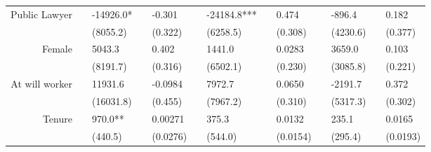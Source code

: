 \begin{tabular}{rrrrrrrrrrrrr}
Public Lawyer & \multicolumn{1}{l}{} & \multicolumn{1}{l}{-14926.0*} & \multicolumn{1}{l}{} & \multicolumn{1}{l}{-0.301} & \multicolumn{1}{l}{} & \multicolumn{1}{l}{-24184.8***} & \multicolumn{1}{l}{} & \multicolumn{1}{l}{0.474} & \multicolumn{1}{l}{} & \multicolumn{1}{l}{-896.4} & \multicolumn{1}{l}{} & \multicolumn{1}{l}{0.182} \\
      & \multicolumn{1}{l}{} & \multicolumn{1}{l}{(8055.2)} & \multicolumn{1}{l}{} & \multicolumn{1}{l}{(0.322)} & \multicolumn{1}{l}{} & \multicolumn{1}{l}{(6258.5)} & \multicolumn{1}{l}{} & \multicolumn{1}{l}{(0.308)} & \multicolumn{1}{l}{} & \multicolumn{1}{l}{(4230.6)} & \multicolumn{1}{l}{} & \multicolumn{1}{l}{(0.377)} \\
Female & \multicolumn{1}{l}{} & \multicolumn{1}{l}{5043.3} & \multicolumn{1}{l}{} & \multicolumn{1}{l}{0.402} & \multicolumn{1}{l}{} & \multicolumn{1}{l}{1441.0} & \multicolumn{1}{l}{} & \multicolumn{1}{l}{0.0283} & \multicolumn{1}{l}{} & \multicolumn{1}{l}{3659.0} & \multicolumn{1}{l}{} & \multicolumn{1}{l}{0.103} \\
      & \multicolumn{1}{l}{} & \multicolumn{1}{l}{(8191.7)} & \multicolumn{1}{l}{} & \multicolumn{1}{l}{(0.316)} & \multicolumn{1}{l}{} & \multicolumn{1}{l}{(6502.1)} & \multicolumn{1}{l}{} & \multicolumn{1}{l}{(0.230)} & \multicolumn{1}{l}{} & \multicolumn{1}{l}{(3085.8)} & \multicolumn{1}{l}{} & \multicolumn{1}{l}{(0.221)} \\
At will worker & \multicolumn{1}{l}{} & \multicolumn{1}{l}{11931.6} & \multicolumn{1}{l}{} & \multicolumn{1}{l}{-0.0984} & \multicolumn{1}{l}{} & \multicolumn{1}{l}{7972.7} & \multicolumn{1}{l}{} & \multicolumn{1}{l}{0.0650} & \multicolumn{1}{l}{} & \multicolumn{1}{l}{-2191.7} & \multicolumn{1}{l}{} & \multicolumn{1}{l}{0.372} \\
      & \multicolumn{1}{l}{} & \multicolumn{1}{l}{(16031.8)} & \multicolumn{1}{l}{} & \multicolumn{1}{l}{(0.455)} & \multicolumn{1}{l}{} & \multicolumn{1}{l}{(7967.2)} & \multicolumn{1}{l}{} & \multicolumn{1}{l}{(0.310)} & \multicolumn{1}{l}{} & \multicolumn{1}{l}{(5317.3)} & \multicolumn{1}{l}{} & \multicolumn{1}{l}{(0.302)} \\
Tenure & \multicolumn{1}{l}{} & \multicolumn{1}{l}{970.0**} & \multicolumn{1}{l}{} & \multicolumn{1}{l}{0.00271} & \multicolumn{1}{l}{} & \multicolumn{1}{l}{375.3} & \multicolumn{1}{l}{} & \multicolumn{1}{l}{0.0132} & \multicolumn{1}{l}{} & \multicolumn{1}{l}{235.1} & \multicolumn{1}{l}{} & \multicolumn{1}{l}{0.0165} \\
      & \multicolumn{1}{l}{} & \multicolumn{1}{l}{(440.5)} & \multicolumn{1}{l}{} & \multicolumn{1}{l}{(0.0276)} & \multicolumn{1}{l}{} & \multicolumn{1}{l}{(544.0)} & \multicolumn{1}{l}{} & \multicolumn{1}{l}{(0.0154)} & \multicolumn{1}{l}{} & \multicolumn{1}{l}{(295.4)} & \multicolumn{1}{l}{} & \multicolumn{1}{l}{(0.0193)} \\

\end{tabular}
